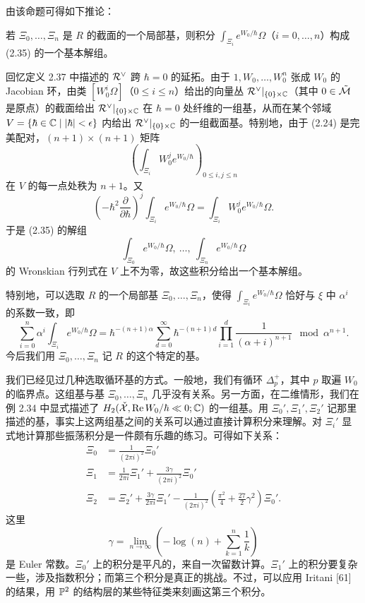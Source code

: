 由该命题可得如下推论：

\begin{lemma}
若 $\Xi_0,\ldots,\Xi_n$ 是 $R$ 的截面的一个局部基，则积分 $\int_{\Xi_i}e^{W_0/\hbar}\Omega$（$i=0,\ldots,n$）构成 (2.35) 的一个基本解组。
\end{lemma}

回忆定义 2.37 中描述的 $\mathcal{R}^\vee$ 跨 $\hbar=0$ 的延拓。由于 $1,W_0,\ldots,W_0^{n}$ 张成 $W_0$ 的 Jacobian 环，由类 $[W_0^{i}\Omega]$（$0\le i\le n$）给出的向量丛 $\mathcal{R}^\vee|_{\{0\}\times\mathbb{C}}$（其中 $0\in\tilde{\mathcal{M}}$ 是原点）的截面给出 $\mathcal{R}^\vee|_{\{0\}\times\mathbb{C}}$ 在 $\hbar=0$ 处纤维的一组基，从而在某个邻域 $V=\{\hbar\in\mathbb{C}\mid|\hbar|<\epsilon\}$ 内给出 $\mathcal{R}^\vee|_{\{0\}\times\mathbb{C}}$ 的一组截面基。特别地，由于 (2.24) 是完美配对，$(n+1)\times(n+1)$ 矩阵
\[
  \left(\int_{\Xi_i}W_0^{j}e^{W_0/\hbar}\right)_{0\le i,j\le n}
\]
在 $V$ 的每一点处秩为 $n+1$。又
\begin{equation}
  \left(-\hbar^{2}\frac{\partial}{\partial\hbar}\right)^{j}\int_{\Xi_i}e^{W_0/\hbar}\Omega
  =\int_{\Xi_i}W_0^{j}e^{W_0/\hbar}\Omega. \tag{2.37}
\end{equation}
于是 (2.35) 的解组
\[
  \int_{\Xi_0}e^{W_0/\hbar}\Omega,\ \ldots,\ \int_{\Xi_n}e^{W_0/\hbar}\Omega
\]
的 Wronskian 行列式在 $V$ 上不为零，故这些积分给出一个基本解组。

特别地，可以选取 $R$ 的一个局部基 $\Xi_0,\ldots,\Xi_n$，使得 $\int_{\Xi_i}e^{W_0/\hbar}\Omega$ 恰好与 $\xi$ 中 $\alpha^{i}$ 的系数一致，即
\begin{equation}
  \sum_{i=0}^{n}\alpha^{i}\int_{\Xi_i}e^{W_0/\hbar}\Omega
  =\hbar^{-(n+1)\alpha}\sum_{d=0}^{\infty}\hbar^{-(n+1)d}
  \prod_{i=1}^{d}\frac{1}{(\alpha+i)^{n+1}}
  \mod\alpha^{n+1}. \tag{2.38}
\end{equation}
今后我们用 $\Xi_0,\ldots,\Xi_n$ 记 $R$ 的这个特定的基。

\begin{remark}
我们已经见过几种选取循环基的方式。一般地，我们有循环 $\Delta_p^{+}$，其中 $p$ 取遍 $W_0$ 的临界点。这组基与基 $\Xi_0,\ldots,\Xi_n$ 几乎没有关系。另一方面，在二维情形，我们在例 2.34 中显式描述了 $H_2(\check{\mathcal{X}},\operatorname{Re} W_0/\hbar\ll0;\mathbb{C})$ 的一组基。用 $\Xi_0',\Xi_1',\Xi_2'$ 记那里描述的基，事实上这两组基之间的关系可以通过直接计算积分来理解。对 $\Xi_i'$ 显式地计算那些振荡积分是一件颇有乐趣的练习。可得如下关系：
\[
  \begin{aligned}
    \Xi_0&=\frac{1}{(2\pi i)^{2}}\Xi_0'\\
    \Xi_1&=\frac{1}{2\pi i}\Xi_1'+\frac{3\gamma}{(2\pi i)^{2}}\Xi_0'\\
    \Xi_2&=\Xi_2'+\frac{3\gamma}{2\pi i}\Xi_1'
    -\frac{1}{(2\pi i)^{2}}\left(\frac{\pi^{2}}{4}+\frac{27}{2}\gamma^{2}\right)\Xi_0'.
  \end{aligned}
\]
这里
\[
  \gamma=\lim_{n\to\infty}\left(-\log(n)+\sum_{k=1}^{n}\frac{1}{k}\right)
\]
是 Euler 常数。$\Xi_0'$ 上的积分是平凡的，来自一次留数计算。$\Xi_1'$ 上的积分要复杂一些，涉及指数积分；而第三个积分是真正的挑战。不过，可以应用 Iritani [61] 的结果，用 $\mathbb{P}^{2}$ 的结构层的某些特征类来刻画这第三个积分。
\end{remark}

